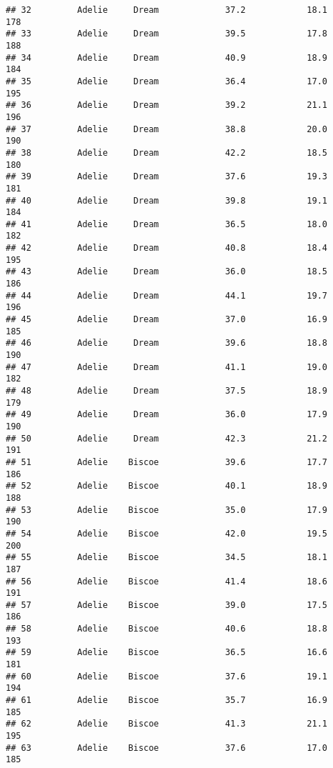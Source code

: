 \documentclass[
]{article}
\begin{document}
\begin{verbatim}
## 32         Adelie     Dream             37.2            18.1               178
## 33         Adelie     Dream             39.5            17.8               188
## 34         Adelie     Dream             40.9            18.9               184
## 35         Adelie     Dream             36.4            17.0               195
## 36         Adelie     Dream             39.2            21.1               196
## 37         Adelie     Dream             38.8            20.0               190
## 38         Adelie     Dream             42.2            18.5               180
## 39         Adelie     Dream             37.6            19.3               181
## 40         Adelie     Dream             39.8            19.1               184
## 41         Adelie     Dream             36.5            18.0               182
## 42         Adelie     Dream             40.8            18.4               195
## 43         Adelie     Dream             36.0            18.5               186
## 44         Adelie     Dream             44.1            19.7               196
## 45         Adelie     Dream             37.0            16.9               185
## 46         Adelie     Dream             39.6            18.8               190
## 47         Adelie     Dream             41.1            19.0               182
## 48         Adelie     Dream             37.5            18.9               179
## 49         Adelie     Dream             36.0            17.9               190
## 50         Adelie     Dream             42.3            21.2               191
## 51         Adelie    Biscoe             39.6            17.7               186
## 52         Adelie    Biscoe             40.1            18.9               188
## 53         Adelie    Biscoe             35.0            17.9               190
## 54         Adelie    Biscoe             42.0            19.5               200
## 55         Adelie    Biscoe             34.5            18.1               187
## 56         Adelie    Biscoe             41.4            18.6               191
## 57         Adelie    Biscoe             39.0            17.5               186
## 58         Adelie    Biscoe             40.6            18.8               193
## 59         Adelie    Biscoe             36.5            16.6               181
## 60         Adelie    Biscoe             37.6            19.1               194
## 61         Adelie    Biscoe             35.7            16.9               185
## 62         Adelie    Biscoe             41.3            21.1               195
## 63         Adelie    Biscoe             37.6            17.0               185

\end{verbatim}
\end{document}
